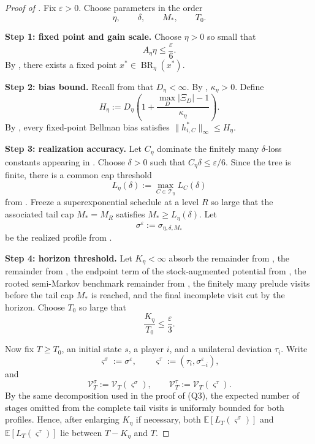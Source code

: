 \documentclass[12pt]{article}
\theoremstyle{definition}
\newcommand{\eps}{\varepsilon}
\newcommand{\E}{\mathbb{E}}
\newcommand{\1}{\mathbf{1}}
\newcommand{\cT}{\mathcal{T}}
\DeclareMathOperator{\BR}{BR}
\begin{document}
\begin{proof}[Proof of ]
Fix $\eps>0$. Choose parameters in the order
\[
\eta,\qquad \delta,\qquad M_*,\qquad T_0.
\]

\smallskip
\noindent\textbf{Step 1: fixed point and gain scale.}
Choose $\eta>0$ so small that
\[
A_\eta\eta\le \frac{\eps}{6}.
\]
By , there exists a fixed point $x^*\in\BR_\eta(x^*)$.

\smallskip
\noindent\textbf{Step 2: bias bound.}
Recall from  that $D_\eta<\infty$. By
, $\kappa_\eta>0$. Define
\[
H_\eta:=D_\eta\left(1+\frac{\max_D|\Xi_D|-1}{\kappa_\eta}\right).
\]
By , every fixed-point Bellman bias satisfies
$\|h_{i,C}^*\|_\infty\le H_\eta$.

\smallskip
\noindent\textbf{Step 3: realization accuracy.}
Let $C_\eta$ dominate the finitely many $\delta$-loss constants appearing in
. Choose
$\delta>0$ such that $C_\eta\delta\le \eps/6$. Since the tree is finite, there
is a common cap threshold
\[
L_\eta(\delta):=\max_{C\in\cT_\eta}L_C(\delta)
\]
from . Freeze a superexponential schedule at a level
$R$ so large that the associated tail cap $M_*=M_R$ satisfies
$M_*\ge L_\eta(\delta)$. Let
\[
\sigma^\eps:=\sigma_{\eta,\delta,M_*}
\]
be the realized profile from .

\smallskip
\noindent\textbf{Step 4: horizon threshold.}
Let $K_\eta<\infty$ absorb the remainder from , the
remainder from , the endpoint term of the stock-augmented potential from
, the rooted semi-Markov benchmark remainder from
, the finitely many prelude visits before the tail
cap $M_*$ is reached, and the final incomplete visit cut by the horizon.
Choose $T_0$ so large that
\[
\frac{K_\eta}{T_0}\le \frac{\eps}{3}.
\]

Now fix $T\ge T_0$, an initial state $s$, a player $i$, and a unilateral
deviation $\tau_i$. Write
\[
\varsigma^\sigma:=\sigma^\eps,
\qquad
\varsigma^\tau:=(\tau_i,\sigma^\eps_{-i}),
\]
and
\[
\mathcal V_T^\sigma:=\mathcal V_T(\varsigma^\sigma),
\qquad
\mathcal V_T^\tau:=\mathcal V_T(\varsigma^\tau).
\]
By the same decomposition used in the proof of
\textnormal{(Q3)}, the expected number of stages omitted
from the complete tail visits is uniformly bounded for both profiles. Hence,
after enlarging $K_\eta$ if necessary, both
$\E[L_T(\varsigma^\sigma)]$ and $\E[L_T(\varsigma^\tau)]$ lie between
$T-K_\eta$ and $T$.


\end{proof}
\end{document}
